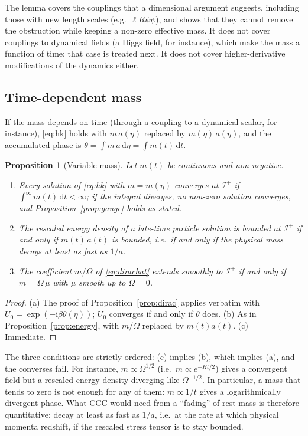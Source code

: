 \documentclass[11pt,a4paper]{article}
\newtheorem{proposition}{Proposition}
\theoremstyle{definition}
\newcommand{\scri}{\mathscr{I}^{+}}
\newcommand{\dd}{\mathrm{d}}
\newcommand{\ii}{\mathrm{i}}
\begin{document}
The lemma covers the couplings that a dimensional argument suggests, including those with new length scales (e.g.\ $\ell R\bar\psi\psi$), and shows that they cannot remove the obstruction while keeping a non-zero effective mass. It does not cover couplings to dynamical fields (a Higgs field, for instance), which make the mass a function of time; that case is treated next. It does not cover higher-derivative modifications of the dynamics either.

\subsection{Time-dependent mass}
\label{sec:varmass}

If the mass depends on time (through a coupling to a dynamical scalar, for instance), \eqref{eq:hk} holds with $m\,a(\eta)$ replaced by $m(\eta)\,a(\eta)$, and the accumulated phase is $\theta=\int m\,a\,\dd\eta=\int m(t)\,\dd t$.

\begin{proposition}[Variable mass]
\label{prop:varmass}
Let $m(t)$ be continuous and non-negative.
\begin{enumerate}[label=(\alph*)]
\item Every solution of \eqref{eq:hk} with $m=m(\eta)$ converges at $\scri$ if $\int^{\infty}m(t)\,\dd t<\infty$; if the integral diverges, no non-zero solution converges, and Proposition~\ref{prop:gauge} holds as stated.
\item The rescaled energy density of a late-time particle solution is bounded at $\scri$ if and only if $m(t)\,a(t)$ is bounded, i.e.\ if and only if the physical mass decays at least as fast as $1/a$.
\item The coefficient $m/\Omega$ of \eqref{eq:dirachat} extends smoothly to $\scri$ if and only if $m=\Omega\,\mu$ with $\mu$ smooth up to $\Omega=0$.
\end{enumerate}
\end{proposition}
\begin{proof}
(a) The proof of Proposition~\ref{prop:dirac} applies verbatim with $U_{0}=\exp(-\ii\beta\theta(\eta))$; $U_{0}$ converges if and only if $\theta$ does. (b) As in Proposition~\ref{prop:energy}, with $m/\Omega$ replaced by $m(t)a(t)$. (c) Immediate.
\end{proof}

The three conditions are strictly ordered: (c) implies (b), which implies (a), and the converses fail. For instance, $m\propto\Omega^{1/2}$ (i.e.\ $m\propto e^{-Ht/2}$) gives a convergent field but a rescaled energy density diverging like $\Omega^{-1/2}$. In particular, a mass that tends to zero is not enough for any of them: $m\propto1/t$ gives a logarithmically divergent phase. What CCC would need from a ``fading'' of rest mass is therefore quantitative: decay at least as fast as $1/a$, i.e.\ at the rate at which physical momenta redshift, if the rescaled stress tensor is to stay bounded.
\end{document}
